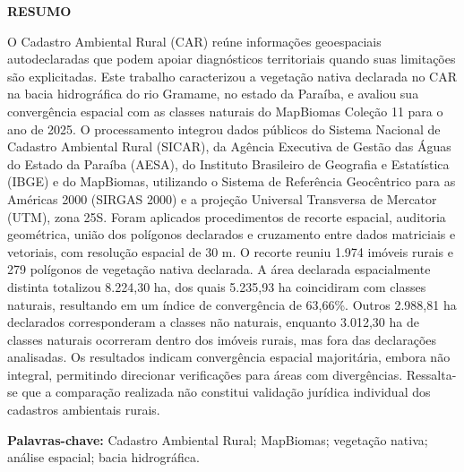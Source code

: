 \documentclass[12pt,oneside,a4paper,brazilian,english,fleqn]{abntex2}
\begin{document}
\cleardoublepage
\begin{center}
{\bfseries\fontsize{12}{14.4}\selectfont RESUMO}
\end{center}
\vspace{1.5\baselineskip}
O Cadastro Ambiental Rural (CAR) reúne informações geoespaciais autodeclaradas que podem apoiar diagnósticos territoriais quando suas limitações são explicitadas. Este trabalho caracterizou a vegetação nativa declarada no CAR na bacia hidrográfica do rio Gramame, no estado da Paraíba, e avaliou sua convergência espacial com as classes naturais do MapBiomas Coleção 11 para o ano de 2025. O processamento integrou dados públicos do Sistema Nacional de Cadastro Ambiental Rural (SICAR), da Agência Executiva de Gestão das Águas do Estado da Paraíba (AESA), do Instituto Brasileiro de Geografia e Estatística (IBGE) e do MapBiomas, utilizando o Sistema de Referência Geocêntrico para as Américas 2000 (SIRGAS 2000) e a projeção Universal Transversa de Mercator (UTM), zona 25S. Foram aplicados procedimentos de recorte espacial, auditoria geométrica, união dos polígonos declarados e cruzamento entre dados matriciais e vetoriais, com resolução espacial de 30 m. O recorte reuniu 1.974 imóveis rurais e 279 polígonos de vegetação nativa declarada. A área declarada espacialmente distinta totalizou 8.224,30 ha, dos quais 5.235,93 ha coincidiram com classes naturais, resultando em um índice de convergência de 63,66\%. Outros 2.988,81 ha declarados corresponderam a classes não naturais, enquanto 3.012,30 ha de classes naturais ocorreram dentro dos imóveis rurais, mas fora das declarações analisadas. Os resultados indicam convergência espacial majoritária, embora não integral, permitindo direcionar verificações para áreas com divergências. Ressalta-se que a comparação realizada não constitui validação jurídica individual dos cadastros ambientais rurais.

\vspace{1.0\baselineskip}
\noindent\textbf{Palavras-chave:} Cadastro Ambiental Rural; MapBiomas; vegetação nativa; análise espacial; bacia hidrográfica.
\end{document}
